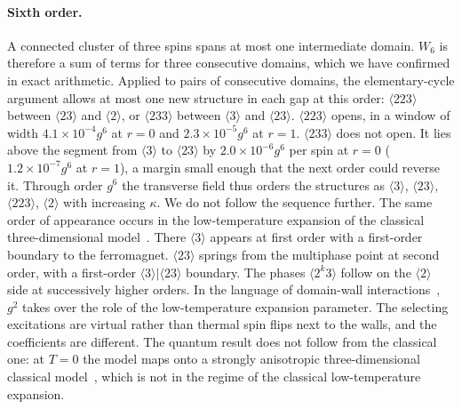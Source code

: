 \paragraph*{Sixth order.}
A connected cluster of three spins spans at most one intermediate domain. $W_6$ is therefore a sum of terms
for three consecutive domains, which we have confirmed in exact arithmetic.
Applied to pairs of consecutive domains, the elementary-cycle argument allows at most one new structure in
each gap at this order: $\langle223\rangle$ between $\langle23\rangle$ and $\langle2\rangle$, or
$\langle233\rangle$ between $\langle3\rangle$ and $\langle23\rangle$. $\langle223\rangle$ opens, in a window of
width $4.1\times10^{-4}g^6$ at $r=0$ and $2.3\times10^{-5}g^6$ at $r=1$.
$\langle233\rangle$ does not open. It lies above the segment from $\langle3\rangle$ to $\langle23\rangle$ by
$2.0\times10^{-6}g^6$ per spin at $r=0$ ($1.2\times10^{-7}g^6$ at $r=1$), a margin small enough that the next
order could reverse it.
Through order $g^6$ the transverse field thus orders the structures as $\langle3\rangle$, $\langle23\rangle$,
$\langle223\rangle$, $\langle2\rangle$ with increasing $\kappa$. We do not follow the sequence further.
The same order of appearance occurs in the low-temperature expansion of the classical three-dimensional
model~\cite{fisher1980infinitely,selke1988annni}. There $\langle3\rangle$ appears at first order with a
first-order boundary to the ferromagnet. $\langle23\rangle$ springs from the multiphase point at second
order, with a first-order $\langle3\rangle|\langle23\rangle$ boundary. The phases $\langle2^k3\rangle$
follow on the $\langle2\rangle$ side at successively higher orders. In the language of domain-wall
interactions~\cite{fisher1987domainI,fisher1987domainII}, $g^2$ takes over the role of the low-temperature
expansion parameter. The selecting excitations are virtual rather than thermal spin flips next to the walls,
and the coefficients are different. The quantum result does not follow from the classical one: at $T=0$ the
model maps onto a strongly anisotropic three-dimensional classical model~\cite{suzuki1976relationship}, which is
not in the regime of the classical low-temperature expansion.

